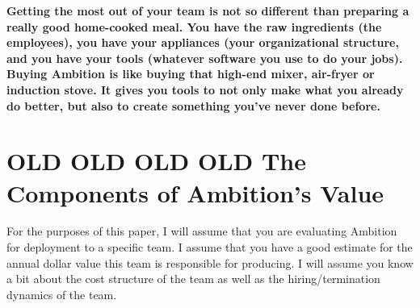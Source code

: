 \documentclass[paper=a4, fontsize=11pt abstract]{scrartcl}
\numberwithin{equation}{section}		%
\numberwithin{figure}{section}			%
\numberwithin{table}{section}				%
\begin{document}
\textbf{Getting the most out of your team is not so different than preparing a really good home-cooked meal. You have the raw ingredients (the employees), you have your appliances (your organizational structure, and you have your tools (whatever software you use to do your jobs).  Buying Ambition is like buying that high-end mixer, air-fryer or induction stove.  It gives you tools to not only make what you already do better, but also to create something you've never done before.}


\section{OLD OLD OLD OLD The Components of Ambition's Value}
For the purposes of this paper, I will assume that you are evaluating Ambition for deployment to a specific team.  I assume that you have a good estimate for the annual dollar value this team is responsible for producing.  I will assume you know a bit about the cost structure of the team as well as the hiring/termination dynamics of the team.
\end{document}
